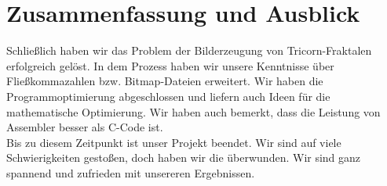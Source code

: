 \documentclass[course=erap]{aspdoc}
\begin{document}
\section{Zusammenfassung und Ausblick}
Schließlich haben wir das Problem der Bilderzeugung von Tricorn-Fraktalen erfolgreich gelöst. In dem Prozess haben wir unsere Kenntnisse über Fließkommazahlen bzw. Bitmap-Dateien erweitert. Wir haben die Programmoptimierung abgeschlossen und liefern auch Ideen für die mathematische Optimierung. Wir haben auch bemerkt, dass die Leistung von Assembler besser als C-Code ist.
\\Bis zu diesem Zeitpunkt ist unser Projekt beendet. Wir sind auf viele Schwierigkeiten gestoßen, doch haben wir die überwunden. Wir sind ganz spannend und zufrieden mit unsereren Ergebnissen.



{}
\end{document}

